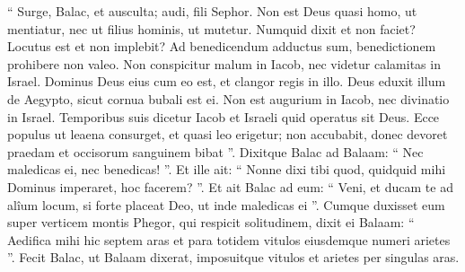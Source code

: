 \begin{biblechapter}
\begin{biblechapter}
\begin{biblechapter}
\begin{biblechapter}
\begin{biblechapter}
\begin{biblechapter}
\begin{biblechapter}
\begin{biblechapter}
\begin{biblechapter}
\begin{biblechapter}
\begin{biblechapter}
\begin{biblechapter}
\begin{biblechapter}
\begin{biblechapter}
\begin{biblechapter}
\begin{biblechapter}
\begin{biblechapter}
\begin{biblechapter}
\begin{biblechapter}
\begin{biblechapter}
\begin{biblechapter}
\begin{biblechapter}
\begin{biblechapter}
 “ Surge, Balac, et ausculta;
 audi, fili Sephor.
 \verse Non est Deus quasi homo, ut mentiatur,
 nec ut filius hominis, ut mutetur.
 Numquid dixit et non faciet?
 Locutus est et non implebit?
 \verse Ad benedicendum adductus sum,
 benedictionem prohibere non valeo. 
\verse Non conspicitur malum in Iacob,
 nec videtur calamitas in Israel.
 Dominus Deus eius cum eo est,
 et clangor regis in illo.
 \verse Deus eduxit illum de Aegypto,
 sicut cornua bubali est ei.
 \verse Non est augurium in Iacob,
 nec divinatio in Israel.
 Temporibus suis dicetur Iacob et Israeli
 quid operatus sit Deus.
 \verse Ecce populus ut leaena consurget,
 et quasi leo erigetur;
 non accubabit, donec devoret praedam
 et occisorum sanguinem bibat ”.
 \verse Dixitque Balac ad Balaam: “ Nec maledicas ei, nec benedicas! ”. 
\verse Et ille ait: “ Nonne dixi tibi quod, quidquid mihi Dominus imperaret, hoc facerem? ”. 
\verse Et ait Balac ad eum: “ Veni, et ducam te ad alîum locum, si forte placeat Deo, ut inde maledicas ei ”. 
\verse Cumque duxisset eum super verticem montis Phegor, qui respicit solitudinem, 
\verse dixit ei Balaam: “ Aedifica mihi hic septem aras et para totidem vitulos eiusdemque numeri arietes ”. 
\verse Fecit Balac, ut Balaam dixerat, imposuitque vitulos et arietes per singulas aras.
 

\end{biblechapter}
\end{biblechapter}
\end{biblechapter}
\end{biblechapter}
\end{biblechapter}
\end{biblechapter}
\end{biblechapter}
\end{biblechapter}
\end{biblechapter}
\end{biblechapter}
\end{biblechapter}
\end{biblechapter}
\end{biblechapter}
\end{biblechapter}
\end{biblechapter}
\end{biblechapter}
\end{biblechapter}
\end{biblechapter}
\end{biblechapter}
\end{biblechapter}
\end{biblechapter}
\end{biblechapter}
\end{biblechapter}
